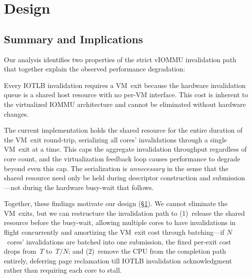 \section{Design}
\label{sec:design}

\subsection{Summary and Implications}

Our analysis identifies two properties of the strict vIOMMU invalidation path that together explain the observed performance degradation:

Every IOTLB invalidation requires a VM~exit because the hardware invalidation queue is a shared host resource with no per-VM interface. This cost is inherent to the virtualized IOMMU architecture and cannot be eliminated without hardware changes.

The current implementation holds the shared resource for the entire duration of the VM~exit round-trip, serializing all cores' invalidations through a single VM~exit at a time. This caps the aggregate invalidation throughput regardless of core count, and the virtualization feedback loop causes performance to degrade beyond even this cap.  The serialization is \emph{unnecessary} in the sense that the shared resource need only be held during descriptor construction and submission---not during the hardware busy-wait that follows.



Together, these findings motivate our design (\S\ref{sec:design}).
We cannot eliminate the VM~exits, but we can restructure the invalidation path to
(1)~release the shared resource before the busy-wait, allowing multiple cores to have invalidations in flight concurrently and amortizing the VM~exit cost through batching---if $N$~cores' invalidations are batched into one submission, the fixed per-exit cost drops from~$T$ to~$T/N$; and
(2)~remove the CPU from the completion path entirely, deferring page reclamation till IOTLB invalidation acknowledgment rather than requiring each core to stall.





